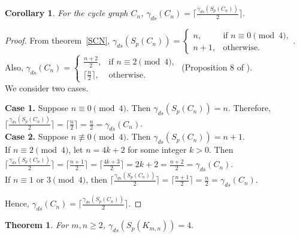\documentclass{article}
\newtheorem{theorem}{Theorem}[section]
\newtheorem{corollary}{Corollary}[section]
\begin{document}
\begin{corollary}
For the cycle graph $C_n$, $\gamma_{ds}(C_n)= \lceil \frac{\gamma_{ds}(S_p(C_n))}{2} \rceil.$
\end{corollary}
\begin{proof}
From theorem~\ref{SCN}, $\gamma_{ds}(S_p(C_n))=
\begin{cases}
n, & \text{if } n\equiv 0 \pmod{4},\\
n+1, & \text{otherwise}.
\end{cases}$. Also, $\gamma_{ds}(C_n)=
\begin{cases}
\frac{n+2}{2}, & \text{if } n\equiv 2 \pmod{4},\\
\lceil \frac{n}{2} \rceil, & \text{otherwise}.
\end{cases}$ (Proposition 8 of \cite{DS}).\\We consider two cases.

\textbf{Case 1.} Suppose $n\equiv 0 \pmod{4}$. Then $\gamma_{ds}(S_p(C_n))= n.$ Therefore, $\lceil \frac{\gamma_{ds}(S_p(C_n))}{2} \rceil= \lceil \frac{n}{2} \rceil= \frac{n}{2}= \gamma_{ds}(C_n)$.  \\

\textbf{Case 2.} Suppose $n\not\equiv 0 \pmod{4}$. Then $\gamma_{ds}(S_p(C_n))= n+1.$\\ If $n\equiv 2 \pmod{4}$, let $n= 4k+2$ for some integer $k>0$. Then $\lceil \frac{\gamma_{ds}(S_p(C_n))}{2} \rceil= \lceil \frac{n+1}{2} \rceil= \lceil \frac{4k+3}{2} \rceil= 2k+2= \frac{n+2}{2}= \gamma_{ds}(C_n)$.\\ If $n\equiv 1 \text{ or } 3 \pmod{4}$, then $\lceil \frac{\gamma_{ds}(S_p(C_n))}{2} \rceil= \lceil \frac{n+1}{2} \rceil= \frac{n}{2}= \gamma_{ds}(C_n)$.

Hence, $\gamma_{ds}(C_n)= \lceil \frac{\gamma_{ds}(S_p(C_n))}{2} \rceil.$

\end{proof}
\begin{theorem}
For $m, n\geq 2$, $\gamma_{ds}(S_p(K_{m,n}))= 4.$
\end{theorem}
\end{document}
